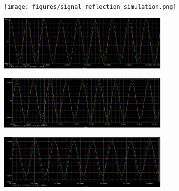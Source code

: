         \begin{figure}[h]
            \centering
            \texttt{[image: figures/signal\_reflection\_simulation.png]}
        \end{figure}
        \begin{figure}[h]
            \centering
            \includegraphics[width=0.75\textwidth]{figures/signal_reflection_simulation_25.png}
        \end{figure}
        \begin{figure}[h]
            \centering
            \includegraphics[width=0.75\textwidth]{figures/signal_reflection_simulation_75.png}
        \end{figure}\begin{figure}[h]
            \centering
            \includegraphics[width=0.75\textwidth]{figures/signal_reflection_simulation_50_33.png}
        \end{figure}
